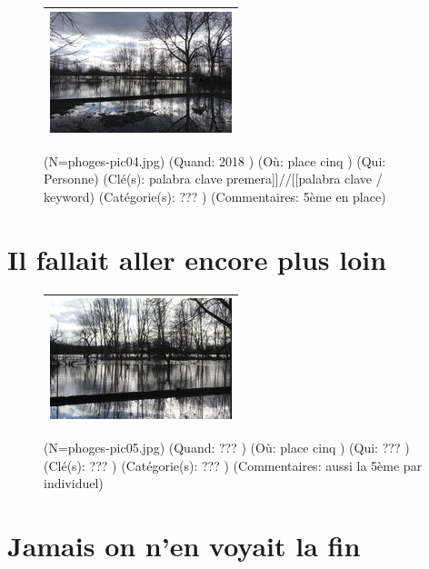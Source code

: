 \documentclass[12pt,twocolumn,french]{article}
\begin{document}
  \begin{figure}[H]
    \caption{
       (N=phoges-pic04.jpg)
       (Quand:  2018 )
       (Où:  place cinq )
       (Qui: Personne)
       (Clé(s): palabra clave premera]]//[[palabra clave / keyword)
       (Catégorie(s): ??? )
       (Commentaires: 5ème en place)
    }
    \vspace{4mm}
    \label{phoges-pic04.jpg}
    \noindent \centering{}
    \begin{tabular}{|c|}
      \hline
          \includegraphics[origin=c,angle=0]{phoges-pic04.jpg}
        \tabularnewline \hline
    \end{tabular}
  \end{figure}
%
\section{ Il fallait aller encore plus loin}
%
  \begin{figure}[H]
    \caption{
       (N=phoges-pic05.jpg)
       (Quand: ??? )
       (Où:  place cinq )
       (Qui: ??? )
       (Clé(s): ??? )
       (Catégorie(s): ??? )
       (Commentaires: aussi la 5ème par individuel)
    }
    \vspace{4mm}
    \label{phoges-pic05.jpg}
    \noindent \centering{}
    \begin{tabular}{|c|}
      \hline
          \includegraphics[origin=c,angle=0]{phoges-pic05.jpg}
        \tabularnewline \hline
    \end{tabular}
  \end{figure}
%
\section{ Jamais on n'en voyait la fin}
%
\end{document}

